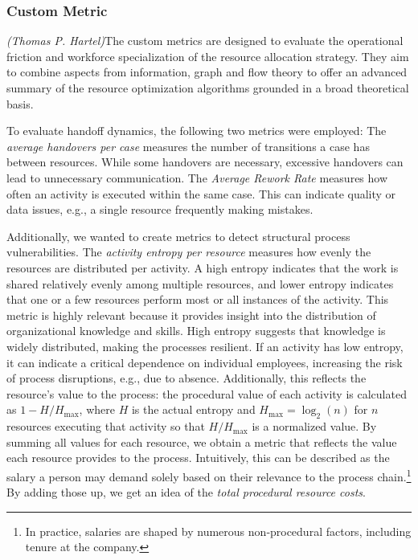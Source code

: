 \subsubsection{Custom Metric}\label{ssub:metrics-custom}
\textit{(Thomas P. Hartel)}\quad The custom metrics are designed to evaluate the operational friction and workforce specialization of the resource allocation strategy. They aim to combine aspects from information, graph and flow theory to offer an advanced summary of the resource optimization algorithms grounded in a broad theoretical basis.

To evaluate handoff dynamics, the following two metrics were employed:
The \emph{average handovers per case} measures the number of transitions a case has between resources. While some handovers are necessary, excessive handovers can lead to unnecessary communication.
The \emph{Average Rework Rate} measures how often an activity is executed within the same case. This can indicate quality or data issues, e.g., a single resource frequently making mistakes.

Additionally, we wanted to create metrics to detect structural process vulnerabilities. 
The \emph{activity entropy per resource} measures how evenly the resources are distributed per activity. A high entropy indicates that the work is shared relatively evenly among multiple resources, and lower entropy indicates that one or a few resources perform most or all instances of the activity. This metric is highly relevant because it provides insight into the distribution of organizational knowledge and skills. High entropy suggests that knowledge is widely distributed, making the processes resilient. If an activity has low entropy, it can indicate a critical dependence on individual employees, increasing the risk of process disruptions, e.g., due to absence. Additionally, this reflects the resource's value to the process: the procedural value of each activity is calculated as $1-H/H_\text{max}$, where $H$ is the actual entropy and $H_\text{max}=\log_2(n)$ for $n$ resources executing that activity so that $H/H_\text{max}$ is a normalized value. By summing all values for each resource, we obtain a metric that reflects the value each resource provides to the process. Intuitively, this can be described as the salary a person may demand solely based on their relevance to the process chain.\footnote{In practice, salaries are shaped by numerous non‑procedural factors, including tenure at the company.} By adding those up, we get an idea of the \emph{total procedural resource costs}.

